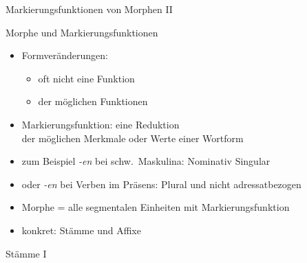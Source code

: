 \begin{frame}
  {Markierungsfunktionen von Morphen II}
  \pause
  \begin{exe}
    \ex
    \begin{xlist}
    \end{xlist}
  \end{exe}
\end{frame}

\begin{frame}
  {Morphe und Markierungsfunktionen}
  \pause
  \begin{itemize}[<+->]
    \item Formveränderungen:
      \begin{itemize}[<+->]
        \item oft nicht \alert{eine} Funktion
        \item {} der möglichen Funktionen
      \end{itemize}
   \Halbzeile 
    \item \alert{Markierungsfunktion}: eine \alert{Reduktion}\\
      der möglichen Merkmale oder Werte einer Wortform
    \item zum Beispiel \textit{-en} bei schw.\ Maskulina:  Nominativ Singular
    \item oder \textit{-en} bei Verben im Präsens: Plural und nicht adressatbezogen
      \Halbzeile
    \item \alert{Morphe = alle segmentalen Einheiten mit Markierungsfunktion}
    \item konkret: \alert{Stämme} und \alert{Affixe}
  \end{itemize}
\end{frame}

\begin{frame}
  {Stämme I}
  \pause
  \begin{exe}
    \ex
    \begin{xlist}
        \pause
        \pause
    \end{xlist}
  \end{exe}
\end{frame}

